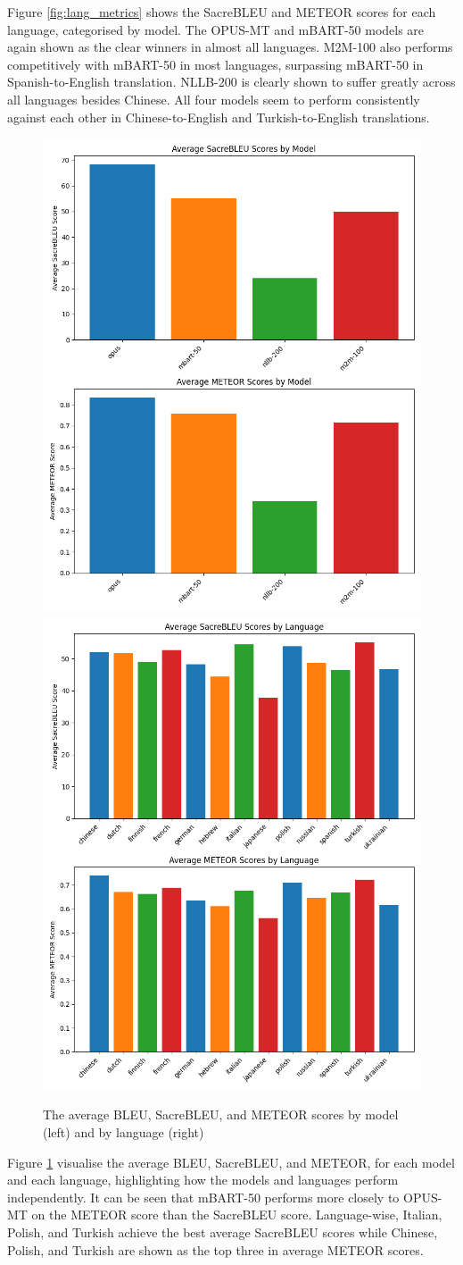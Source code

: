 \documentclass[a4paper, 11pt]{article}
\begin{document}
Figure \ref{fig:lang_metrics} shows the SacreBLEU and METEOR scores for each language, categorised by model. The OPUS-MT and mBART-50 models are again shown as the clear winners in almost all languages. M2M-100 also performs competitively with mBART-50 in most languages, surpassing mBART-50 in Spanish-to-English translation. NLLB-200 is clearly shown to suffer greatly across all languages besides Chinese. All four models seem to perform consistently against each other in Chinese-to-English and Turkish-to-English translations.

\begin{figure}[htbp]
    \centering
    \includegraphics[width=0.49\linewidth]{figures/average_metrics_bar.png}
    \includegraphics[width=0.49\linewidth]{figures/average_metrics_lang_bar.png}
    \caption{The average BLEU, SacreBLEU, and METEOR scores by model (left) and by language (right)}
    \label{fig:average_bars}
\end{figure}

Figure \ref{fig:average_bars} visualise the average BLEU, SacreBLEU, and METEOR, for each model and each language, highlighting how the models and languages perform independently. It can be seen that mBART-50 performs more closely to OPUS-MT on the METEOR score than the SacreBLEU score. Language-wise, Italian, Polish, and Turkish achieve the best average SacreBLEU scores while Chinese, Polish, and Turkish are shown as the top three in average METEOR scores.
\end{document}
